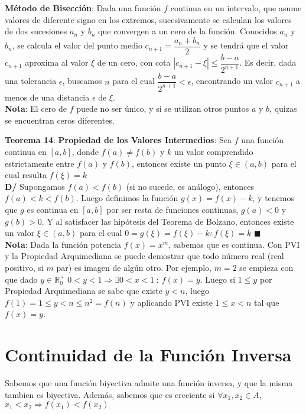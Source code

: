 \documentclass[11pt,a4paper]{article}
\newcommand*{\QEDA}{\null\nobreak\hfill\ensuremath{\blacksquare}}
\begin{document}
\noindent \textbf{M\'etodo de Bisecci\'on}: Dada una funci\'on $f$ continua en un intervalo, que asume valores de diferente signo en los extremos, sucesivamente se calculan los valores de dos sucesiones $a_n$ y $b_n$ que convergen a un cero de la funci\'on. Conocidos $a_n$ y $b_n$, se calcula el valor del punto medio $c_{n+1} = \dfrac{a_n+b_n}{2}$ y se tendr\'a que el valor $c_{n+1}$ aproxima al valor $\xi$ de un cero, con cota $|c_{n+1} - \xi| \leq \dfrac{b-a}{2^{n+1}}$. Es decir, dada una tolerancia $\epsilon$, buscamos $n$ para el cual $\dfrac{b-a}{2^{n+1}} < \epsilon$, encontrando un valor $c_{n+1}$ a menos de una distancia $\epsilon$ de $\xi$.\\

\noindent \textbf{Nota}: El cero de $f$ puede no ser \'unico, y si se utilizan otros puntos $a$ y $b$, quizas se encuentran ceros diferentes.\\

\newpage

\noindent \textbf{Teorema 14}: \textbf{Propiedad de los Valores Intermedios}: Sea $f$ una funci\'on continua en $[a,b]$, donde $f(a) \not = f(b)$ y $k$ un valor comprendido estrictamente entre $f(a)$ y $f(b)$, entonces existe un punto $\xi \in (a,b)$ para el cual resulta $f(\xi)=k$\\
\noindent \textbf{D/} Supongamos $f(a)<f(b)$ (si no sucede, es an\'alogo), entonces $f(a)<k<f(b)$. Luego definimos la funci\'on $g(x) = f(x)-k$, y tenemos que $g$ es continua en $[a,b]$ por ser resta de funciones continuas, $g(a)<0$ y $g(b)>0$. Y al satisfacer las hip\'otesis del Teorema de Bolzano, entonces existe un valor $\xi \in (a,b)$ para el cual $0=g(\xi) = f(\xi)-k \therefore f(\xi)=k$ \QEDA\\

\noindent \textbf{Nota}: Dada la funci\'on potencia $f(x)=x^m$, sabemos que es continua. Con PVI y la Propiedad Arquimediana se puede demostrar que todo n\'umero real (real positivo, si $m$ par) es imagen de alg\'un otro. Por ejemplo, $m=2$ se empieza con que dado $y\in \mathbb{R}^+_0$ $0<y<1 \Rightarrow \exists 0<x<1\ :\ f(x)=y$. Luego si $1\leq y$ por Propiedad Arquimediana se sabe que existe $y<n$, luego $f(1)=1\leq y<n\leq n^2 = f(n)$ y aplicando PVI existe $1\leq x < n$ tal que $f(x)=y$.

\section{Continuidad de la Funci\'on Inversa}
Sabemos que una funci\'on biyectiva admite una funci\'on inversa, y que la misma tambien es biyectiva. Adem\'as, sabemos que es creciente si $\forall x_1, x_2 \in A$, $x_1 < x_2 \Rightarrow f(x_1) < f(x_2)$\\
\end{document}
